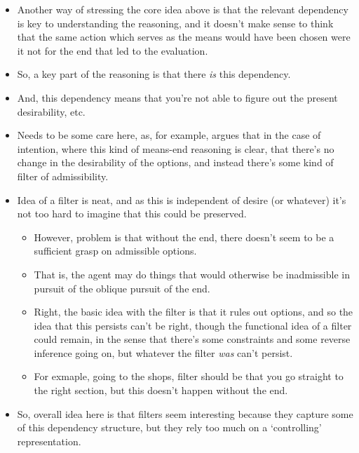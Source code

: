 \documentclass[10pt]{article}
\begin{document}
\begin{itemize}
\item Another way of stressing the core idea above is that the relevant dependency is key to understanding the reasoning, and it doesn't make sense to think that the same action which serves as the means would have been chosen were it not for the end that led to the evaluation.
\item So, a key part of the reasoning is that there \emph{is} this dependency.
\item And, this dependency means that you're not able to figure out the present desirability, etc.
\item Needs to be some care here, as, for example, \citeauthor{Bratman:1987aa} argues that in the case of intention, where this kind of means-end reasoning is clear, that there's no change in the desirability of the options, and instead there's some kind of filter of admissibility.
\item Idea of a filter is neat, and as this is independent of desire (or whatever) it's not too hard to imagine that this could be preserved.
  \begin{itemize}
  \item However, problem is that without the end, there doesn't seem to be a sufficient grasp on admissible options.
  \item That is, the agent may do things that would otherwise be inadmissible in pursuit of the oblique pursuit of the end.
  \item Right, the basic idea with the filter is that it rules out options, and so the idea that this persists can't be right, though the functional idea of a filter could remain, in the sense that there's some constraints and some reverse inference going on, but whatever the filter \emph{was} can't persist.
  \item For exmaple, going to the shops, filter should be that you go straight to the right section, but this doesn't happen without the end.
  \end{itemize}
\item So, overall idea here is that filters seem interesting because they capture some of this dependency structure, but they rely too much on a `controlling' representation.
\end{itemize}
\end{document}
